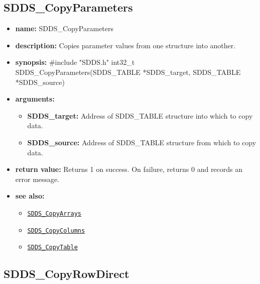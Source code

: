 \documentclass[11pt]{article}
\newcommand{\progref}[1]{\hyperref[SDDS_#1]{\tt SDDS\_#1}}
\begin{document}
\subsection{SDDS\_CopyParameters}
\label{SDDS_CopyParameters}

\begin{itemize}
\item {\bf name:}\newline
SDDS\_CopyParameters
\item {\bf description:}\newline
Copies parameter values from one structure into another.
\item {\bf synopsis:} \#include "SDDS.h"\newline
int32\_t SDDS\_CopyParameters(SDDS\_TABLE *SDDS\_target, SDDS\_TABLE *SDDS\_source)
\item {\bf arguments:}
\begin{itemize}
\item {\bf SDDS\_target:} Address of SDDS\_TABLE structure into which to copy data.
\item {\bf SDDS\_source:} Address of SDDS\_TABLE structure from which to copy data.
\end{itemize}
\item {\bf return value:}\newline
Returns 1 on success. On failure, returns 0 and records an error message.
\item {\bf see also:}
\begin{itemize}
\item \progref{CopyArrays}
\item \progref{CopyColumns}
\item \progref{CopyTable}
\end{itemize}
\end{itemize}

\subsection{SDDS\_CopyRowDirect}
\label{SDDS_CopyRowDirect}
\end{document}
